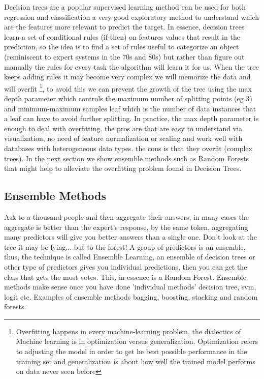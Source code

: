 \documentclass[12pt]{report}
\begin{document}
Decision trees are a popular supervised learning method can be used for both regression and classification  a very good exploratory method to understand which are the features more relevant to predict the target.
In essence, decision trees learn a set of conditional rules (if-then) on features values that result in the prediction, so the idea is to find a set of rules useful to categorize an object (reminiscent to expert systems in the 70s and 80s) but rather than figure out manually the rules for every task the algorithm will learn it for us.
When the tree keeps adding rules it may become very complex we will memorize the data and will overfit \footnote{Overfitting happens in every machine-learning problem, the dialectics of Machine learning is in optimization versus generalization. Optimization refers to adjusting the model in order to get he best possible performance in the training set and generalization is about how well the trained model performs on data never seen before}, to avoid this we can prevent the growth of the tree using the max depth parameter which controls the maximum number of splitting points (eg 3) and minimum-maximum samples leaf which is the number of data instances that a leaf can have to avoid further splitting.  In practice, the max depth parameter is enough to deal with overfitting.
the pros are that are easy to understand via visualization, no need of feature normalization or scaling and work well with databases with heterogeneous data types. the cons is that they overfit (complex trees). In the next section we show ensemble methods such as Random Forests that might help to alleviate the overfitting problem found in Decision Trees.

\subsection{Ensemble Methods}
Ask to a thousand people and then aggregate their answers, in many cases the aggregate is better than the expert's response, by the same token, aggregating many predictors will give you better answers than a single one.
Don't look at the tree it may be lying... but to the forest!
A group of predictors is an ensemble, thus, the technique is called Ensemble Learning, an ensemble of decision trees or other type of predictors gives you individual predictions, then you can get the class that gets the most votes. This, in essence is a Random Forest.
Ensemble methods make sense once you have done 'individual methods' decision tree, svm, logit etc. 
Examples of ensemble methods bagging, boosting, stacking and random forests.
\end{document}
